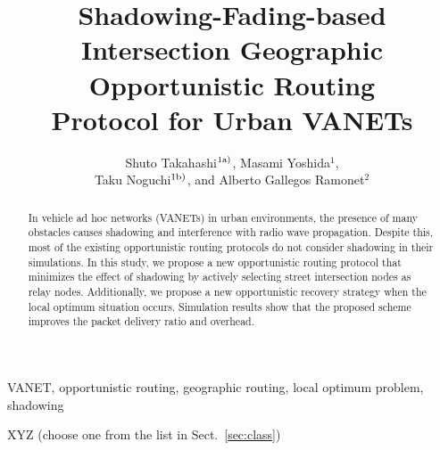 \documentclass{comex}
\title{Shadowing-Fading-based \\Intersection  Geographic \\Opportunistic Routing \\ Protocol for Urban VANETs}
\author{Shuto Takahashi$^{\rm 1a)}$, Masami Yoshida$^{1}$,\\ Taku Noguchi$^{\rm 1b)}$, and Alberto Gallegos Ramonet$^{2}$}
\begin{document}
\maketitle

\begin{abstract}   

In vehicle ad hoc networks (VANETs) in urban environments, the presence of many obstacles causes shadowing and interference with radio wave propagation. Despite this, most of the existing opportunistic routing protocols do not consider shadowing in their simulations. In this study, we propose a new opportunistic routing protocol that minimizes the effect of shadowing by actively selecting street intersection nodes as relay nodes.
Additionally, we propose a new opportunistic recovery strategy when the local optimum situation occurs. Simulation results show that the proposed scheme improves the packet delivery ratio and overhead.

\end{abstract}

\begin{keywords}
VANET, opportunistic routing, geographic routing, local optimum problem, shadowing
\end{keywords}

\begin{classification}
XYZ (choose one from the list in Sect.~\ref{sec:class})
\end{classification}







\end{document}
